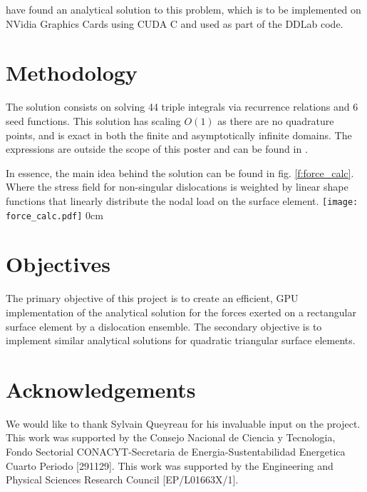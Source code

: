 \begin{multicols}{2}
{		\citet{analytical_integration_of_the_forces_induced_by_dislocations_on_a_surface_element} have found an analytical solution to this problem, which is to be implemented on NVidia Graphics Cards using CUDA C and used as part of the DDLab code.
	\section{Methodology}
		The solution consists on solving 44 triple integrals via recurrence relations and 6 seed functions. This solution has scaling $ O(1) $ as there are no quadrature points, and is exact in both the finite and asymptotically infinite domains. The expressions are outside the scope of this poster and can be found in \cite{analytical_integration_of_the_forces_induced_by_dislocations_on_a_surface_element}.
		
		In essence, the main idea behind the solution can be found in fig. \ref{f:force_calc}. Where the stress field for non-singular dislocations \cite{a_non-singular_continuum_theory_of_dislocations} is weighted by linear shape functions that linearly distribute the nodal load on the surface element.
		{%
			\texttt{[image: force\_calc.pdf]}
			\label{f:force_calc}
		}{0cm}
	\section{Objectives}
		The primary objective of this project is to create an efficient, GPU implementation of the analytical solution for the forces exerted on a rectangular surface element by a dislocation ensemble. The secondary objective is to implement similar analytical solutions for quadratic triangular surface elements.
	\section{Acknowledgements}
		We would like to thank Sylvain Queyreau for his invaluable input on the project. This work was supported by the Consejo Nacional de Ciencia y Tecnologia, Fondo Sectorial CONACYT-Secretaria de Energia-Sustentabilidad Energetica Cuarto Periodo [291129]. This work was supported by the Engineering and Physical Sciences Research Council [EP/L01663X/1].
}


\end{multicols}

